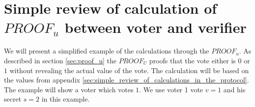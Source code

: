 \chapter{Simple review of calculation of $PROOF_u$ between voter and verifier}
\label{sec:simple_review_of_calculation_of_proof_u_between_voter_and_verifier}
We will present a simplified example of the calculations through the $PROOF_u$. As described in section  \ref{sec:proof_u} the $PROOF_U$ proofs that the vote  either is $0$ or $1$ without revealing the actual value of the vote. The calculation will be based on the values  from appendix \ref{sec:simple_review_of_calculations_in_the_protocol}. The example will show a voter which votes $1$. We use voter 1 vote $v=1$ and his secret $s=2$ in this example.


